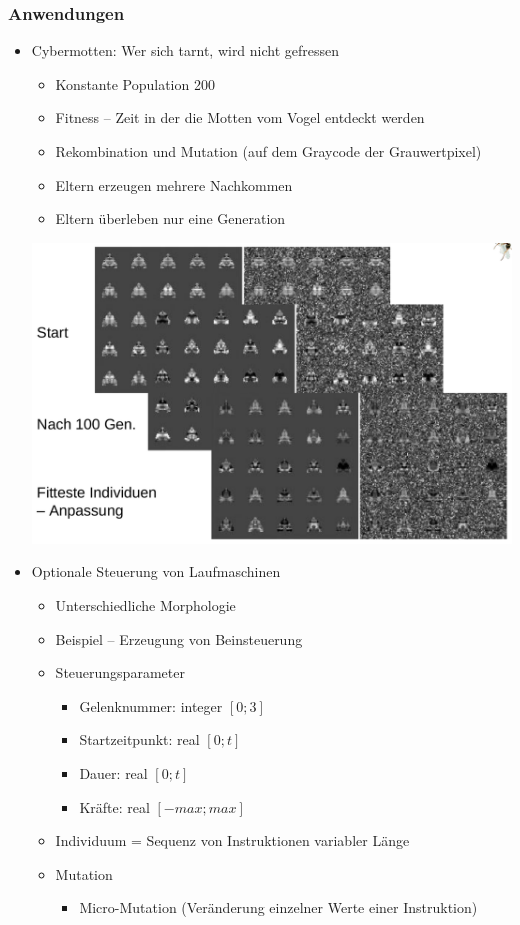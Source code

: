 \subsubsection{Anwendungen}
\begin{itemize}
	\item Cybermotten: Wer sich tarnt, wird nicht gefressen
	\begin{itemize}
		\item Konstante Population 200
		\item Fitness -- Zeit in der die Motten vom Vogel entdeckt werden
		\item Rekombination und Mutation (auf dem Graycode der Grauwertpixel)
		\item Eltern erzeugen mehrere Nachkommen
		\item Eltern überleben nur eine Generation
	\end{itemize}
	\begin{center}
	\includegraphics[width=.5\textwidth]{figures/cybermotten.png}
	\end{center}
	\item Optionale Steuerung von Laufmaschinen
	\begin{itemize}
		\item Unterschiedliche Morphologie
		\item Beispiel -- Erzeugung von Beinsteuerung
		\item Steuerungsparameter
		\begin{itemize}
			\item Gelenknummer: integer $[0;3]$
			\item Startzeitpunkt: real $[0;t]$
			\item Dauer: real $[0;t]$
			\item Kräfte: real $[-max;max]$
		\end{itemize}
		\item Individuum = Sequenz von Instruktionen variabler Länge
		\item Mutation
		\begin{itemize}
			\item Micro-Mutation (Veränderung einzelner Werte einer Instruktion)

\end{itemize}
\end{itemize}
\end{itemize}
